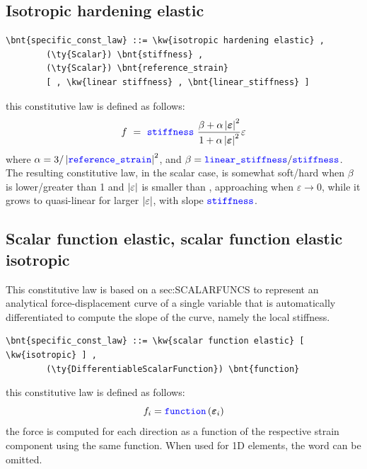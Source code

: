 \subsection{Isotropic hardening elastic}
\begin{Verbatim}[commandchars=\\\{\}]
    \bnt{specific_const_law} ::= \kw{isotropic hardening elastic} ,
        (\ty{Scalar}) \bnt{stiffness} ,
        (\ty{Scalar}) \bnt{reference_strain}
        [ , \kw{linear stiffness} , \bnt{linear_stiffness} ]
\end{Verbatim}
this constitutive law is defined as follows:
\begin{displaymath}
    f \ = \ \textcolor{blue}{\texttt{stiffness}} \ \frac{
        \beta + \alpha\left| \boldsymbol{\varepsilon} \right|^2
    }{
        1 + \alpha\left| \boldsymbol{\varepsilon} \right|^2
    }\varepsilon
\end{displaymath}
where $\alpha=3/\left| \textcolor{blue}{\texttt{reference\_strain}} \right|^2$,
and $\beta=\textcolor{blue}{\texttt{linear\_stiffness}}/\textcolor{blue}{\texttt{stiffness}}$.
The resulting constitutive law, in the scalar case,
is somewhat soft/hard when $\beta$ is lower/greater than 1
and $\left| \varepsilon \right|$ is smaller than ,
approaching  when $\varepsilon\rightarrow{0}$,
while it grows to quasi-linear for larger $\left| \varepsilon \right|$, 
with slope $\textcolor{blue}{\texttt{stiffness}}$.

\subsection{Scalar function elastic, scalar function elastic isotropic}
This constitutive law is based on a 
	{sec:SCALARFUNCS}
to represent an analytical force-displacement curve 
of a single variable that is automatically differentiated 
to compute the slope of the curve, namely the local stiffness.
\begin{Verbatim}[commandchars=\\\{\}]
    \bnt{specific_const_law} ::= \kw{scalar function elastic} [ \kw{isotropic} ] ,
        (\ty{DifferentiableScalarFunction}) \bnt{function}
\end{Verbatim}
this constitutive law is defined as follows:
\begin{displaymath}
	f_i = \textcolor{blue}{\texttt{function}}\left( \boldsymbol{\varepsilon}_i \right)
\end{displaymath}
the force is computed for each direction as a function of the respective
strain component using the same function.
When used for 1D elements, the word  can be omitted.

